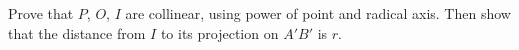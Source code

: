 Prove that $P$, $O$, $I$ are collinear, using power of point and radical axis. Then show that the distance from $I$ to its projection on $A'B'$ is $r$.
